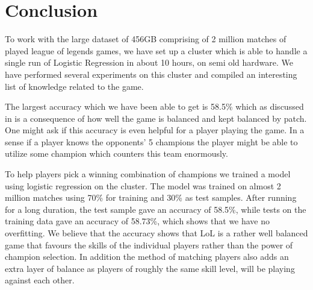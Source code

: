 \section{Conclusion}\label{sec:conclusion}
To work with the large dataset of 456GB comprising of 2 million matches of played league of legends games, we have set up a cluster which is able to handle a single run of Logistic Regression in about 10 hours, on semi old hardware. We have performed several experiments on this cluster and compiled an interesting list of knowledge related to the game.

The largest accuracy which we have been able to get is 58.5\% which as discussed in  is a consequence of how well the game is balanced and kept balanced by patch. One might ask if this accuracy is even helpful for a player playing the game. In a sense if a player knows the opponents' 5 champions the player might be able to utilize some champion which counters this team enormously.

To help players pick a winning combination of champions we trained a model using logistic regression on the cluster. The model was trained on almost 2 million matches using 70\% for training and 30\% as test samples. After running for a long duration, the test sample gave an accuracy of 58.5\%, while tests on the training data gave an accuracy of 58.73\%, which shows that we have no overfitting. We believe that the accuracy shows that LoL is a rather well balanced game that favours the skills of the individual players rather than the power of champion selection. In addition the method of matching players also adds an extra layer of balance as players of roughly the same skill level, will be playing against each other.



